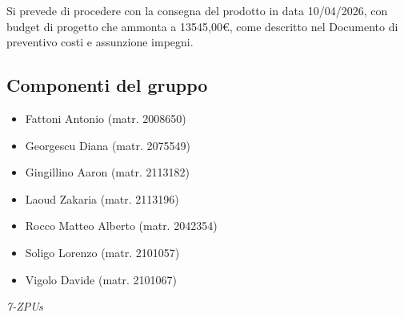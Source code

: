 \documentclass[a4paper,12pt]{article}
\begin{document}
\noindent Si prevede di procedere con la consegna del prodotto in data 10/04/2026, con budget di progetto che ammonta a 13545,00€, come descritto nel Documento di preventivo costi e assunzione impegni.

\subsection*{Componenti del gruppo}
\begin{itemize}[noitemsep]
    \item Fattoni Antonio (matr. 2008650)
    \item Georgescu Diana (matr. 2075549)
    \item Gingillino Aaron (matr. 2113182)
    \item Laoud Zakaria (matr. 2113196)
    \item Rocco Matteo Alberto (matr. 2042354)
    \item Soligo Lorenzo (matr. 2101057)
    \item Vigolo Davide (matr. 2101067)
\end{itemize}



\vfill
\begin{flushright}
    \textit{7-ZPUs}
\end{flushright}
\end{document}
